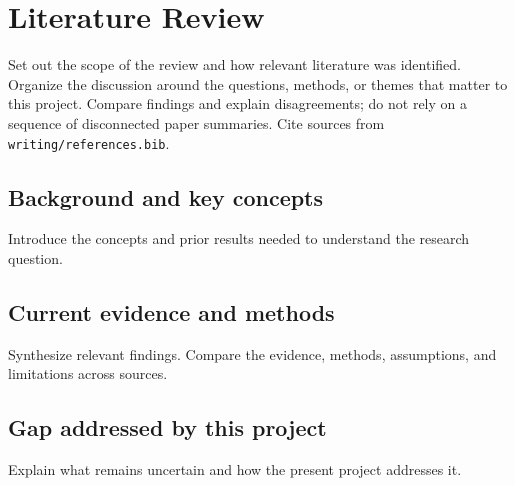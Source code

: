 \chapter{Literature Review}

Set out the scope of the review and how relevant literature was identified. Organize the discussion around the questions, methods, or themes that matter to this project. Compare findings and explain disagreements; do not rely on a sequence of disconnected paper summaries. Cite sources from \texttt{writing/references.bib}.

\section{Background and key concepts}

Introduce the concepts and prior results needed to understand the research question.

\section{Current evidence and methods}

Synthesize relevant findings. Compare the evidence, methods, assumptions, and limitations across sources.

\section{Gap addressed by this project}

Explain what remains uncertain and how the present project addresses it.
